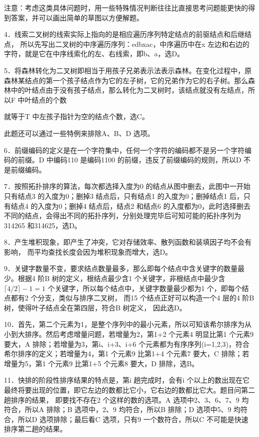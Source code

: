 \documentclass[UTF8,11pt]{ctexart}
\begin{document}
注意：考虑这类具体问题时，用一些特殊情况判断往往比直接思考问题能更快的得到答案，并可以画出简单的草图以方便解题。


4．线索二叉树的线索实际上指向的是相应遍历序列特定结点的前驱结点和后继结点， 所以先写出二叉树的中序遍历序列：edbxac，中序遍历中在x 左边和右边的字符，就是它在中序线索化的左、右线索，即b、a，选D。


5．将森林转化为二叉树即相当于用孩子兄弟表示法表示森林。在变化过程中，原森林某结点的第一个孩子结点作为它的左子树，它的兄弟作为它的右子树。那么森林中的叶结点由于没有孩子结点，那么转化为二叉树时，该结点就没有左结点，所以F 中叶结点的个数


就等于T 中左孩子指针为空的结点个数，选C。


此题还可以通过一些特例来排除A、B、D 选项。


6．前缀编码的定义是在一个字符集中，任何一个字符的编码都不是另一个字符编码的前缀。D 中编码110 是编码1100 的前缀，违反了前缀编码的规则，所以D 不是前缀编码。


7．按照拓扑排序的算法，每次都选择入度为0 的结点从图中删去，此图中一开始只有结点3 的入度为0；删掉3 结点后，只有结点1 的入度为0；删掉结点1 后，只有结点4 的入度为0；删掉4 结点后，结点2 和结点6 的入度都为0，此时选择删去不同的结点，会得出不同的拓扑序列，分别处理完毕后可知可能的拓扑序列为314265 和314625，选D。


8．产生堆积现象，即产生了冲突，它对存储效率、散列函数和装填因子均不会有影响， 而平均查找长度会因为堆积现象而增大，选D。


9．关键字数量不变，要求结点数量最多，那么即每个结点中含关键字的数量最少。根据4 阶B 树的定义，根结点最少含1 个关键字，非根结点中最少含\(\displaystyle \lceil4/2\rceil-1=1\) 个关键字，所以每个结点中，关键字数量最少都为1 个，即每个结点都有2 个分支，类似与排序二叉树， 而15 个结点正好可以构造一个4 层的4 阶B 树，使得叶子结点全在第四层，符合B 树定义， 因此选D。


10．首先，第二个元素为1，是整个序列中的最小元素，所以可知该希尔排序为从小到大排序。然后考虑增量问题，若增量为2，第1+2 个元素4 明显比第1 个元素9 要大，A 排除；若增量为3，第i、i+3、i+6 个元素都为有序序列(i=1,2,3)，符合希尔排序的定义；若增量为4，第1 个元素9 比第1+4 个元素7 要大，C 排除；若增量为5，第1 个元素9 比第1+5 个元素8 要大，D 排除，选B。


11．快排的阶段性排序结果的特点是，第i 趟完成时，会有i 个以上的数出现在它最终将要出现的位置，即它左边的数都比它小，它右边的数都比它大。题目问第二趟排序的结果， 即要找不存在2 个这样的数的选项。A 选项中2、3、6、7、9 均符合，所以A 排除；B 选项中，2、9 均符合，所以B 排除；D 选项中5、9 均符合，所以D 选项排除；最后看C 选项，只有9 一个数符合，所以C 不可能是快速排序第二趟的结果。
\end{document}
